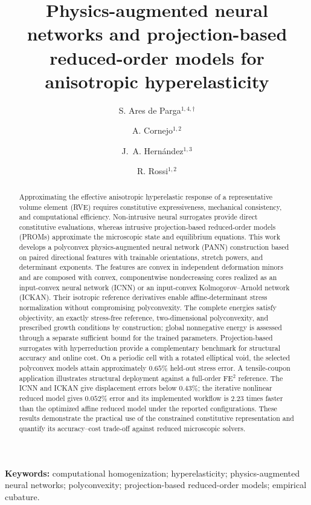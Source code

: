 \documentclass[10pt,a4paper]{article}
\title{Physics-augmented neural networks and projection-based reduced-order models for anisotropic hyperelasticity}
\author{
S. Ares de Parga$^{1,4,\dagger}$ \and
A. Cornejo$^{1,2}$ \and
J.~A. Hern\'andez$^{1,3}$ \and
R. Rossi$^{1,2}$
}
\date{\parbox{.97\textwidth}{\centering\footnotesize
$^1$Centre Internacional de M\`{e}todes Num\`{e}rics en Enginyeria (CIMNE), Barcelona, Spain\\[.3em]
$^2$Universitat Polit\`{e}cnica de Catalunya, Department of Civil and Environmental Engineering (DECA), Barcelona, Spain\\[.3em]
$^3$Universitat Polit\`{e}cnica de Catalunya, Departament de Resist\`{e}ncia de Materials i Estructures a l'Enginyeria, E.S. d'Enginyeries Industrial, Aeroespacial i Audiovisual de Terrassa (ESEIAAT), Terrassa, Spain\\[.3em]
$^4$Department of Aeronautics and Astronautics, Stanford University, Stanford, CA 94305, USA\\[.7em]
\textsuperscript{\(\dagger\)} This work was conducted while S. Ares de Parga was affiliated with CIMNE.\\[.7em]
10 September 2026 --- Working draft v0.2}}
\begin{document}
\maketitle
\begin{abstract}
Approximating the effective anisotropic hyperelastic response of a representative volume element (RVE) requires constitutive expressiveness, mechanical consistency, and computational efficiency. Non-intrusive neural surrogates provide direct constitutive evaluations, whereas intrusive projection-based reduced-order models (PROMs) approximate the microscopic state and equilibrium equations. This work develops a polyconvex physics-augmented neural network (PANN) construction based on paired directional features with trainable orientations, stretch powers, and determinant exponents. The features are convex in independent deformation minors and are composed with convex, componentwise nondecreasing cores realized as an input-convex neural network (ICNN) or an input-convex Kolmogorov--Arnold network (ICKAN). Their isotropic reference derivatives enable affine-determinant stress normalization without compromising polyconvexity. The complete energies satisfy objectivity, an exactly stress-free reference, two-dimensional polyconvexity, and prescribed growth conditions by construction; global nonnegative energy is assessed through a separate sufficient bound for the trained parameters. Projection-based surrogates with hyperreduction provide a complementary benchmark for structural accuracy and online cost. On a periodic cell with a rotated elliptical void, the selected polyconvex models attain approximately $0.65\%$ held-out stress error. A tensile-coupon application illustrates structural deployment against a full-order FE$^2$ reference. The ICNN and ICKAN give displacement errors below $0.43\%$; the iterative nonlinear reduced model gives $0.052\%$ error and its implemented workflow is $2.23$ times faster than the optimized affine reduced model under the reported configurations. These results demonstrate the practical use of the constrained constitutive representation and quantify its accuracy--cost trade-off against reduced microscopic solvers.
\end{abstract}
\noindent\textbf{Keywords:} computational homogenization; hyperelasticity; physics-augmented neural networks; polyconvexity; projection-based reduced-order models; empirical cubature.








\end{document}
